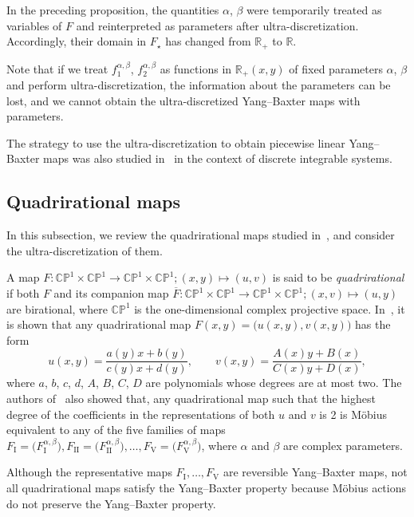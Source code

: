 \documentclass[pdftex]{sigma}
\numberwithin{equation}{section}
\def\R{\mathbb{R}}
\def\a{{\alpha}}
\def\b{{\beta}}
\begin{document}
\begin{Remark}
In the preceding proposition, the quantities $\alpha$, $\beta$ were temporarily treated as variables of $F$ and reinterpreted as parameters after ultra-discretization.
Accordingly, their domain in $F_{\star}$ has changed from $\mathbb{R}_{+}$ to $\mathbb{R}$.

Note that if we treat $f_1^{\alpha,\beta}$, $f_2^{\alpha,\beta}$ as functions in $\R_+(x,y)$ of fixed parameters $\a$, $\b$ and perform ultra-discretization, the information about the parameters can be lost, and we cannot obtain the ultra-discretized Yang--Baxter maps with parameters.
\end{Remark}

\begin{Remark}
The strategy to use the ultra-discretization to obtain piecewise linear Yang--Baxter maps was also studied in~\cite{KNW2, KNW} in the context of discrete integrable systems.
\end{Remark}


\subsection{Quadrirational maps}
In this subsection, we review the quadrirational maps
studied in~\cite{ABS,PSTV,SU},
and consider the ultra-discretization of them.

A map $F\colon\mathbb{CP}^1\times\mathbb{CP}^1\to\mathbb{CP}^1\times\mathbb{CP}^1; (x,y)\mapsto(u,v)$ is said to be
{\it quadrirational} if both $F$ and its companion map
$\overline{F}\colon\mathbb{CP}^1\times\mathbb{CP}^1\to\mathbb{CP}^1\times\mathbb{CP}^1; (x,v)\mapsto(u,y)$ are birational, where $\mathbb{CP}^1$ is the one-dimensional complex projective space.
In~\cite{ABS}, it is shown that
any quadrirational map $F(x,y)=\bigl(u(x,y),v(x,y)\bigr)$ has
the form
\[
u(x,y)=\frac{a(y)x+b(y)}{c(y)x+d(y)},\qquad
v(x,y)=\frac{A(x)y+B(x)}{C(x)y+D(x)},
\]
where $a$, $b$, $c$, $d$, $A$, $B$, $C$, $D$ are polynomials whose degrees are at most two.
The authors of~\cite{ABS} also showed that,
any quadrirational map
such that the highest degree of the coefficients in
the representations of both $u$ and $v$ is 2
is M\"{o}bius equivalent to any of the five families of maps
$F_{\mathrm{I}}=\bigl(F_{\mathrm{I}}^{\alpha,\beta}\bigr),
F_{\mathrm{II}}=\bigl(F_{\mathrm{II}}^{\alpha,\beta}\bigr), \ldots,
F_{\mathrm{V}}=\bigl(F_{\mathrm{V}}^{\alpha,\beta}\bigr)$, where $\alpha$ and $\beta$ are
complex parameters.

Although the representative maps $F_{\mathrm{I}}, \ldots, F_{\mathrm{V}}$ are reversible Yang--Baxter maps, not all quadrirational maps satisfy
the Yang--Baxter property because M\"{o}bius actions do not preserve the Yang--Baxter property.
\end{document}
